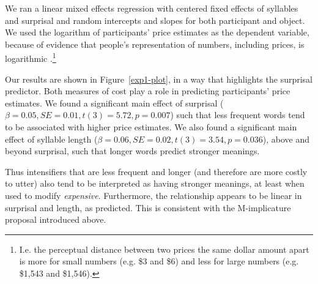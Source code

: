 \documentclass[10pt,letterpaper]{article}
\begin{document}
We ran a linear mixed effects regression with centered fixed effects of syllables and surprisal and random intercepts and slopes for both participant and object.
We used the logarithm of participants' price estimates as the dependent variable, because of evidence that people's representation of numbers, including prices, is logarithmic \cite[e.g.]{dehaene}.\footnote{
  I.e. the perceptual distance between two prices the same dollar amount apart is more for small numbers (e.g. \$3 and \$6) and less for large numbers (e.g. \$1,543 and \$1,546).
}

Our results are shown in Figure~\ref{exp1-plot}, in a way that highlights the surprisal predictor. Both measures of cost play a role in predicting participants' price estimates. We found a significant main effect of surprisal ($\beta=0.05, SE=0.01, t(3)=5.72, p=0.007$) such that less frequent words tend to be associated with higher price estimates. We also found a significant main effect of syllable length ($\beta=0.06, SE=0.02, t(3)=3.54, p=0.036$), above and beyond surprisal, such that longer words predict stronger meanings.




Thus intensifiers that are less frequent and longer (and therefore are more costly to utter) also tend to be interpreted as having stronger meanings, at least when used to modify \emph{expensive}. Furthermore, the relationship appears to be linear in surprisal and length, as predicted.
This is consistent with the M-implicature proposal introduced above.
\end{document}
